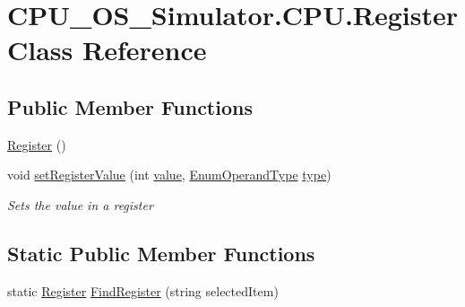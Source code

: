 \hypertarget{class_c_p_u___o_s___simulator_1_1_c_p_u_1_1_register}{}\section{C\+P\+U\+\_\+\+O\+S\+\_\+\+Simulator.\+C\+P\+U.\+Register Class Reference}
\label{class_c_p_u___o_s___simulator_1_1_c_p_u_1_1_register}
\subsection*{Public Member Functions}
\begin{DoxyCompactItemize}
\item 
\hyperlink{class_c_p_u___o_s___simulator_1_1_c_p_u_1_1_register_a1ee1fb682bf9349209b31a50aff2de45}{Register} ()
\item 
void \hyperlink{class_c_p_u___o_s___simulator_1_1_c_p_u_1_1_register_a29b6a87aa7d0bb7fc118b021fc559482}{set\+Register\+Value} (int \hyperlink{class_c_p_u___o_s___simulator_1_1_c_p_u_1_1_register_af2a05af808a3e2fa5fb086844cab1c2d}{value}, \hyperlink{namespace_c_p_u___o_s___simulator_1_1_c_p_u_ad49cfe442b74115a326c03b7ae848f76}{Enum\+Operand\+Type} \hyperlink{class_c_p_u___o_s___simulator_1_1_c_p_u_1_1_register_acb2f0f96db7cdee5c175562a5f050d83}{type})
\begin{DoxyCompactList}\small\item\em Sets the value in a register \end{DoxyCompactList}\end{DoxyCompactItemize}
\subsection*{Static Public Member Functions}
\begin{DoxyCompactItemize}
\item 
static \hyperlink{class_c_p_u___o_s___simulator_1_1_c_p_u_1_1_register}{Register} \hyperlink{class_c_p_u___o_s___simulator_1_1_c_p_u_1_1_register_aa1c8b83312ee8b41c4d9cbd328354a6b}{Find\+Register} (string selected\+Item)
\end{DoxyCompactItemize}
